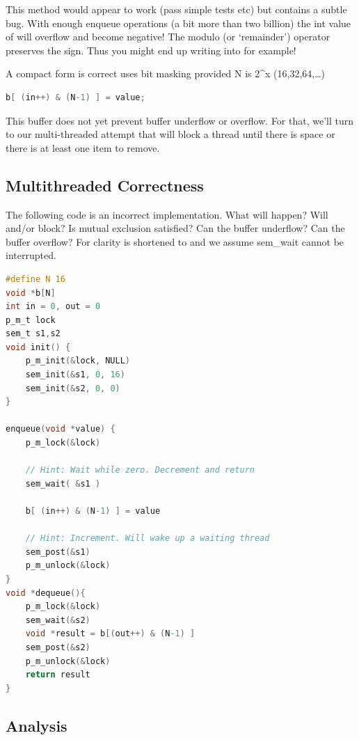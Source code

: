 This method would appear to work (pass simple tests etc) but contains a subtle bug. With enough enqueue operations (a bit more than two billion) the int value of  will overflow and become negative! The modulo (or `remainder') operator \keyword{\%} preserves the sign. Thus you might end up writing into  for example!

A compact form is correct uses bit masking provided N is 2\^{}x (16,32,64,\ldots{})

\begin{lstlisting}[language=C]
b[ (in++) & (N-1) ] = value;
\end{lstlisting}

This buffer does not yet prevent buffer underflow or overflow. For that, we'll turn to our multi-threaded attempt that will block a thread until there is space or there is at least one item to remove.


\subsection{Multithreaded Correctness}\label{checking-a-multi-threaded-implementation-for-correctness-example-1}

The following code is an incorrect implementation. What will happen? Will  and/or  block? Is mutual exclusion satisfied? Can the buffer underflow? Can the buffer overflow? For clarity  is shortened to  and we assume sem\_wait cannot be interrupted.

\begin{lstlisting}[language=C]
#define N 16
void *b[N]
int in = 0, out = 0
p_m_t lock
sem_t s1,s2
void init() { 
    p_m_init(&lock, NULL)
    sem_init(&s1, 0, 16)
    sem_init(&s2, 0, 0)
}

enqueue(void *value) {
    p_m_lock(&lock)

    // Hint: Wait while zero. Decrement and return
    sem_wait( &s1 ) 
 
    b[ (in++) & (N-1) ] = value

    // Hint: Increment. Will wake up a waiting thread 
    sem_post(&s1) 
    p_m_unlock(&lock)
}
void *dequeue(){
    p_m_lock(&lock)
    sem_wait(&s2)
    void *result = b[(out++) & (N-1) ]
    sem_post(&s2)
    p_m_unlock(&lock)
    return result
}
\end{lstlisting}

\subsection{Analysis}\label{analysis}

